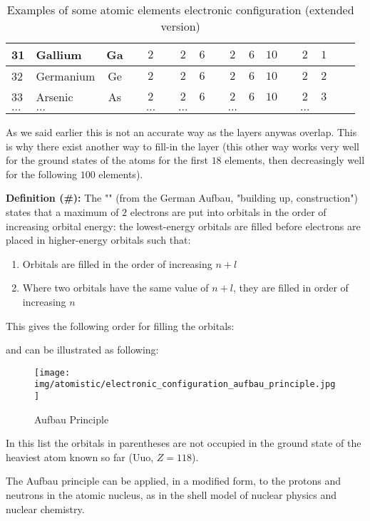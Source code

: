 \begin{table}[H]
\begin{center}
\begin{tabular}{|l|lc|c|c|c|c|c|c|c|c|c|c|c|c|c|c|}
				31 & Gallium & Ga & & $2$ & & $2$ & $6$ & & $2$ & $6$ & $10$ & & $2$ & $1$ \\ \hline
				32 & Germanium & Ge & & $2$ & & $2$ & $6$ & & $2$ & $6$ & $10$ & & $2$ & $2$ \\ \hline
				33 & Arsenic & As & & $2$ & & $2$ & $6$ & & $2$ & $6$ & $10$ & & $2$ & $3$ \\ \hline
				$\ldots$ & $\ldots$ & & & $\ldots$ & & $\ldots$ & & & $\ldots$ & & & & $\ldots$  \\ \hline
			\end{tabular}
		\end{center}
		\caption{Examples of some atomic elements electronic configuration (extended version)}
	\end{table}
	As we said earlier this is not an accurate way as the layers anywas overlap. This is why there exist another way to fill-in the layer (this other way works very well for the ground states of the atoms for the first $18$ elements, then decreasingly well for the following $100$ elements).

	\pagebreak
	\textbf{Definition (\#\mydef):} The "" (from the German Aufbau, "building up, construction") states that a maximum of $2$ electrons are put into orbitals in the order of increasing orbital energy: the lowest-energy orbitals are filled before electrons are placed in higher-energy orbitals such that:
	\begin{enumerate}
		\item Orbitals are filled in the order of increasing $n+l$

		\item Where two orbitals have the same value of $n+l$, they are filled in order of increasing $n$
	\end{enumerate}
	This gives the following order for filling the orbitals:
	
	and can be illustrated as following:
	\begin{figure}[H]
		\centering
		\texttt{[image: img/atomistic/electronic\_configuration\_aufbau\_principle.jpg]}
		\caption{Aufbau Principle}
	\end{figure}
	In this list the orbitals in parentheses are not occupied in the ground state of the heaviest atom known so far ($\mathrm{Uuo}$, $Z = 118$).
	
	The Aufbau principle can be applied, in a modified form, to the protons and neutrons in the atomic nucleus, as in the shell model of nuclear physics and nuclear chemistry.
	
